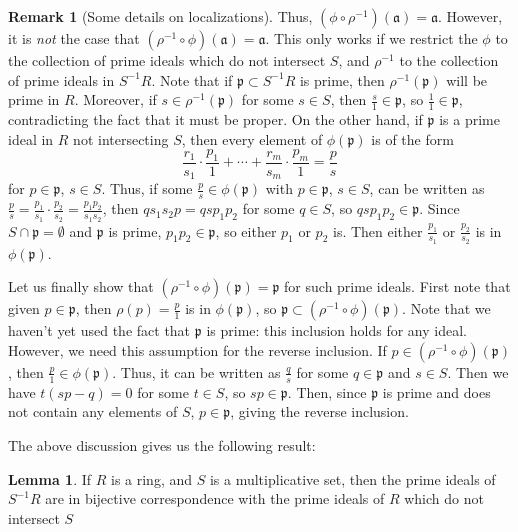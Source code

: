 \documentclass[aps,pra,showpacs,notitlepage,onecolumn,superscriptaddress,nofootinbib]{revtex4-1}
\theoremstyle{definition}
\newtheorem{lemma}{Lemma}[section]
\newtheorem{remark}{Remark}[section]
\begin{document}
\begin{remark}[Some details on localizations]
  Thus, $(\phi \circ \rho^{-1})(\mathfrak{a}) = \mathfrak{a}$. However, it is \emph{not} the case that $(\rho^{-1} \circ \phi)(\mathfrak{a}) = \mathfrak{a}$. This only works if we restrict the $\phi$ to the collection
  of prime ideals which do not intersect $S$, and $\rho^{-1}$ to the collection of prime ideals in $S^{-1} R$. Note that if $\mathfrak{p} \subset S^{-1} R$ is prime, then $\rho^{-1}(\mathfrak{p})$ will be prime
  in $R$. Moreover, if $s \in \rho^{-1}(\mathfrak{p})$ for some $s \in S$, then $\frac{s}{1} \in \mathfrak{p}$, so $\frac{1}{1} \in \mathfrak{p}$, contradicting the fact that it must be proper. On the other hand,
  if $\mathfrak{p}$ is a prime ideal in $R$ not intersecting $S$, then every element of $\phi(\mathfrak{p})$ is of the form
  \begin{equation}
    \frac{r_1}{s_1} \cdot \frac{p_1}{1} + \cdots + \frac{r_m}{s_m} \cdot \frac{p_m}{1} = \frac{p}{s}
    \end{equation}
  for $p \in \mathfrak{p}$, $s \in S$. Thus, if some $\frac{p}{s} \in \phi(\mathfrak{p})$ with $p \in \mathfrak{p}$, $s \in S$,
  can be written as $\frac{p}{s} = \frac{p_1}{s_1} \cdot \frac{p_2}{s_2} = \frac{p_1 p_2}{s_1 s_2}$, then $q s_1 s_2 p =  qs p_1 p_2$ for some $q \in S$, so $qs p_1 p_2 \in \mathfrak{p}$. Since $S \cap \mathfrak{p} = \emptyset$
  and $\mathfrak{p}$ is prime, $p_1 p_2 \in \mathfrak{p}$, so either $p_1$ or $p_2$ is. Then either $\frac{p_1}{s_1}$ or $\frac{p_2}{s_2}$ is in $\phi(\mathfrak{p})$.

  Let us finally show that $(\rho^{-1} \circ \phi)(\mathfrak{p}) = \mathfrak{p}$ for such prime ideals. First note that given $p \in \mathfrak{p}$, then $\rho(p) = \frac{p}{1}$ is in $\phi(\mathfrak{p})$, so
  $\mathfrak{p} \subset (\rho^{-1} \circ \phi)(\mathfrak{p})$. Note that we haven't yet used the fact that $\mathfrak{p}$ is prime: this inclusion holds for any ideal. However, we need this assumption for the reverse inclusion.
  If $p \in (\rho^{-1} \circ \phi)(\mathfrak{p})$, then $\frac{p}{1} \in \phi(\mathfrak{p})$. Thus, it can be written as $\frac{q}{s}$ for some $q \in \mathfrak{p}$ and $s \in S$. Then we have
  $t (sp - q) = 0$ for some $t \in S$, so $sp \in \mathfrak{p}$. Then, since $\mathfrak{p}$ is prime and does not contain any elements of $S$, $p \in \mathfrak{p}$, giving the reverse inclusion.
  \end{remark}

\noindent The above discussion gives us the following result:

\begin{lemma}
  \label{lem:s}
  If $R$ is a ring, and $S$ is a multiplicative set, then the prime ideals of $S^{-1} R$ are in bijective correspondence with the prime ideals of $R$ which do not intersect $S$
  \end{lemma}
\end{document}
